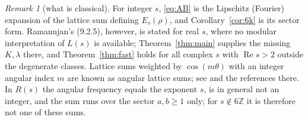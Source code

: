 \documentclass[11pt]{article}
\theoremstyle{remark}
\newtheorem{remark}{Remark}
\begin{document}
\begin{remark}[what is classical]\label{rem:classical}
For integer $s$, \eqref{eq:AB} is the Lipschitz (Fourier) expansion of the lattice sum defining $E_s(\rho)$, and
Corollary~\ref{cor:6k} is its sector form. Ramanujan's (9.2.5), however, is stated for real $s$, where no modular interpretation of
$L(s)$ is available; Theorem~\ref{thm:main} supplies the missing $K,\lambda$ there, and Theorem~\ref{thm:fast} holds for all complex $s$
with $\operatorname{Re}s>2$ outside the degenerate classes.
Lattice sums weighted by $\cos(m\theta)$ with an integer angular index $m$ are known as angular lattice sums; see
\cite[Ch.~3]{BGMWZ} and the references there. In $R(s)$ the angular frequency equals the exponent $s$, is in general not an
integer, and the sum runs over the sector $a,b\ge1$ only; for $s\notin6\mathbb Z$ it is therefore not one of these sums.
\end{remark}
\end{document}

